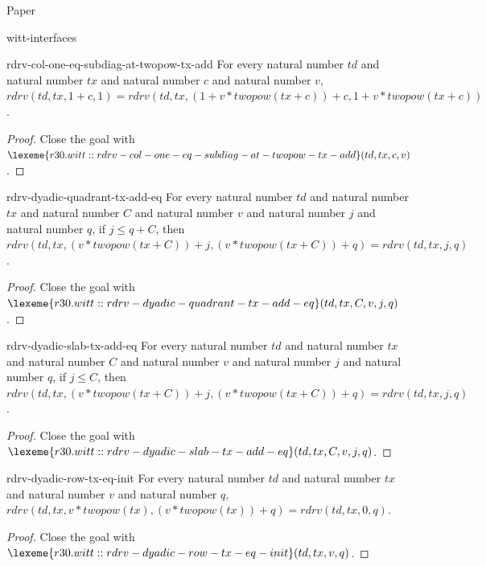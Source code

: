 \begin{lexlean}{Paper}
\begin{section}{witt-interfaces}
  \begin{theorem}{rdrv-col-one-eq-subdiag-at-twopow-tx-add}
  For every natural number \(td\) and natural number \(tx\) and natural number \(c\) and natural number \(v\), \(rdrv(td, tx, 1 + c, 1) = rdrv(td, tx, (1 + v * twopow(tx + c)) + c, 1 + v * twopow(tx + c))\).
  \begin{proof}
  Close the goal with \(\lexeme{r30.witt::rdrv-col-one-eq-subdiag-at-twopow-tx-add}(td, tx, c, v)\).
  \end{proof}
  \end{theorem}

  \begin{theorem}{rdrv-dyadic-quadrant-tx-add-eq}
  For every natural number \(td\) and natural number \(tx\) and natural number \(C\) and natural number \(v\) and natural number \(j\) and natural number \(q\), if \(j ≤ q + C\), then \(rdrv(td, tx, (v * twopow(tx + C)) + j, (v * twopow(tx + C)) + q) = rdrv(td, tx, j, q)\).
  \begin{proof}
  Close the goal with \(\lexeme{r30.witt::rdrv-dyadic-quadrant-tx-add-eq}(td, tx, C, v, j, q)\).
  \end{proof}
  \end{theorem}

  \begin{theorem}{rdrv-dyadic-slab-tx-add-eq}
  For every natural number \(td\) and natural number \(tx\) and natural number \(C\) and natural number \(v\) and natural number \(j\) and natural number \(q\), if \(j ≤ C\), then \(rdrv(td, tx, (v * twopow(tx + C)) + j, (v * twopow(tx + C)) + q) = rdrv(td, tx, j, q)\).
  \begin{proof}
  Close the goal with \(\lexeme{r30.witt::rdrv-dyadic-slab-tx-add-eq}(td, tx, C, v, j, q)\).
  \end{proof}
  \end{theorem}

  \begin{theorem}{rdrv-dyadic-row-tx-eq-init}
  For every natural number \(td\) and natural number \(tx\) and natural number \(v\) and natural number \(q\), \(rdrv(td, tx, v * twopow(tx), (v * twopow(tx)) + q) = rdrv(td, tx, 0, q)\).
  \begin{proof}
  Close the goal with \(\lexeme{r30.witt::rdrv-dyadic-row-tx-eq-init}(td, tx, v, q)\).
  \end{proof}
  \end{theorem}


\end{section}
\end{lexlean}
